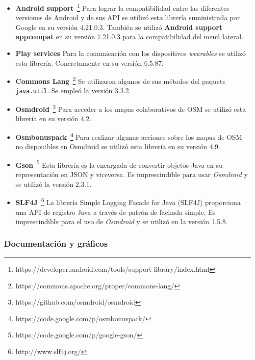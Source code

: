 \begin{itemize}
  \item \textbf{Android
    support}~\footnote{https://developer.android.com/tools/support-library/index.html} Para lograr
    la compatibilidad entre las diferentes versiones de Android y de sus \acs{API} se utilizó esta
    librería suministrada por Google en su versión 4.21.0.3. También se utilizó \textbf{Android
      support appcompat} en su versión 7.21.0.3 para la compatibilidad del menú lateral.

  \item \textbf{Play services} Para la comunicación con los dispositivos \emph{wearables} se utilizó
    esta librería. Concretamente en su versión 6.5.87.

  \item \textbf{Commons Lang}~\footnote{https://commons.apache.org/proper/commons-lang/} Se
    utilizaron algunos de sus métodos del paquete \texttt{java.util}. Se empleó la versión 3.3.2.

  \item \textbf{Osmdroid}~\footnote{https://github.com/osmdroid/osmdroid} Para acceder a los mapas
    colaborativos de \acs{OSM} se utilizó esta librería en su versión 4.2.

  \item \textbf{Osmbonuspack}~\footnote{https://code.google.com/p/osmbonuspack/} Para realizar
    algunas acciones sobre los mapas de \acs{OSM} no disponibles en Osmdroid se utilizó esta
    librería en su versión 4.9.

  \item \textbf{Gson}~\footnote{https://code.google.com/p/google-gson/} Esta librería es la
    encargada de convertir objetos Java en su representación en JSON y viceversa. Es imprescindible
    para usar \emph{Osmdroid} y se utilizó la versión 2.3.1.

  \item \textbf{SLF4J}~\footnote{http://www.slf4j.org/} La librería Simple Logging Facade for Java
    (SLF4J) proporciona una \acs{API} de registro Java a través de patrón de fachada simple. Es
    imprescindible para el uso de \emph{Osmdroid} y se utilizó en la versión 1.5.8.

\end{itemize}

\subsubsection{Documentación y gráficos}

